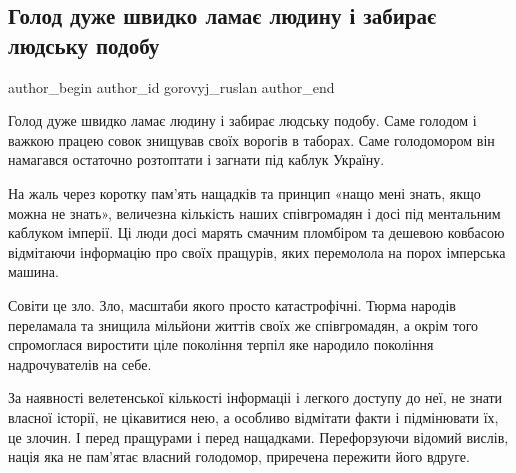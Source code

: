  
 
 
 
 
 
\subsection{Голод дуже швидко ламає людину і забирає людську подобу}
\label{sec:27_11_2021.fb.gorovyj_ruslan.1.golod_chelovek}
 
\ifcmt
 author_begin
   author_id gorovyj_ruslan
 author_end
\fi

Голод дуже швидко ламає людину і забирає людську подобу. Саме голодом і важкою
працею совок знищував своїх ворогів в таборах. Саме голодомором він намагався
остаточно розтоптати і загнати під каблук Україну. 

На жаль через коротку пам’ять нащадків та принцип «нащо мені знать, якщо можна
не знать», величезна кількість наших співгромадян і досі під ментальним
каблуком імперії. Ці люди досі марять смачним пломбіром та дешевою ковбасою
відмітаючи інформацію про своїх пращурів, яких перемолола на порох імперська
машина.

Совіти це зло. Зло, масштаби якого просто катастрофічні. Тюрма народів
переламала та знищила мільйони життів своїх же співгромадян, а окрім того
спромоглася виростити ціле покоління терпіл яке народило покоління
надрочувателів на себе.

За наявності велетенської кількості інформаціі і легкого доступу до неї, не
знати власної історії, не цікавитися нею,  а особливо відмітати факти і
підмінювати їх, це злочин. І перед пращурами і перед нащадками. Перефорзуючи
відомий вислів, нація яка не пам’ятає власний голодомор, приречена пережити
його вдруге.

